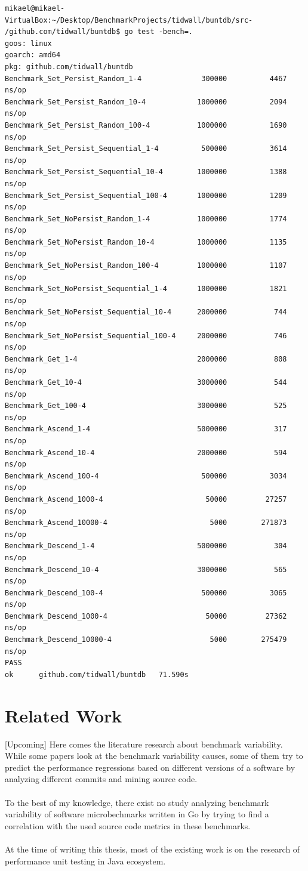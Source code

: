 \documentclass{seal_thesis}
\begin{document}
\begin{lstlisting}[caption=Example microbenchmark suite execution from \cite{tidwall/buntdb}., label={testbench}, frame=single]
mikael@mikael-VirtualBox:~/Desktop/BenchmarkProjects/tidwall/buntdb/src-
/github.com/tidwall/buntdb$ go test -bench=.
goos: linux
goarch: amd64
pkg: github.com/tidwall/buntdb
Benchmark_Set_Persist_Random_1-4           	  300000	      4467 ns/op
Benchmark_Set_Persist_Random_10-4          	 1000000	      2094 ns/op
Benchmark_Set_Persist_Random_100-4         	 1000000	      1690 ns/op
Benchmark_Set_Persist_Sequential_1-4       	  500000	      3614 ns/op
Benchmark_Set_Persist_Sequential_10-4      	 1000000	      1388 ns/op
Benchmark_Set_Persist_Sequential_100-4     	 1000000	      1209 ns/op
Benchmark_Set_NoPersist_Random_1-4         	 1000000	      1774 ns/op
Benchmark_Set_NoPersist_Random_10-4        	 1000000	      1135 ns/op
Benchmark_Set_NoPersist_Random_100-4       	 1000000	      1107 ns/op
Benchmark_Set_NoPersist_Sequential_1-4     	 1000000	      1821 ns/op
Benchmark_Set_NoPersist_Sequential_10-4    	 2000000	       744 ns/op
Benchmark_Set_NoPersist_Sequential_100-4   	 2000000	       746 ns/op
Benchmark_Get_1-4                          	 2000000	       808 ns/op
Benchmark_Get_10-4                         	 3000000	       544 ns/op
Benchmark_Get_100-4                        	 3000000	       525 ns/op
Benchmark_Ascend_1-4                       	 5000000	       317 ns/op
Benchmark_Ascend_10-4                      	 2000000	       594 ns/op
Benchmark_Ascend_100-4                     	  500000	      3034 ns/op
Benchmark_Ascend_1000-4                    	   50000	     27257 ns/op
Benchmark_Ascend_10000-4                   	    5000	    271873 ns/op
Benchmark_Descend_1-4                      	 5000000	       304 ns/op
Benchmark_Descend_10-4                     	 3000000	       565 ns/op
Benchmark_Descend_100-4                    	  500000	      3065 ns/op
Benchmark_Descend_1000-4                   	   50000	     27362 ns/op
Benchmark_Descend_10000-4                  	    5000	    275479 ns/op
PASS
ok  	github.com/tidwall/buntdb	71.590s
\end{lstlisting}



\section{Related Work}
[Upcoming]
Here comes the literature research about benchmark variability. While some papers look at the benchmark variability causes, some of them try to predict the performance regressions based on different versions of a software by analyzing different commits and mining source code. \\
\\
To the best of my knowledge, there exist no study analyzing benchmark variability of software microbechmarks written in Go by trying to find a correlation with the used source code metrics in these benchmarks.\\
\\
At the time of writing this thesis, most of the existing work is on the research of performance unit testing in Java ecosystem.\cite{Stefan:2017:UTP:3030207.3030226}
\end{document}
